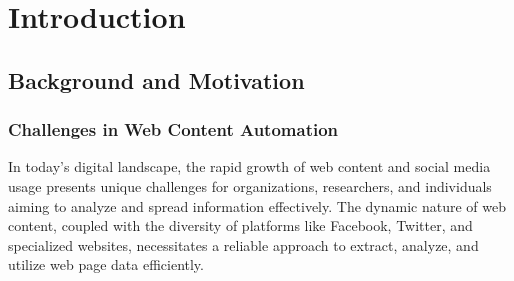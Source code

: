 
\chapter{Introduction}
\label{chp:introduction}


\section{Background and Motivation}
\label{sec:background_motivation}

\subsection{Challenges in Web Content Automation}
\label{sec:challenges_in_web_content_automation}
In today's digital landscape, the rapid growth of web content and social media usage presents unique challenges for organizations, researchers, and individuals aiming to analyze and spread information effectively. The dynamic nature of web content, coupled with the diversity of platforms like Facebook, Twitter, and specialized websites, necessitates a reliable approach to extract, analyze, and utilize web page data efficiently.

